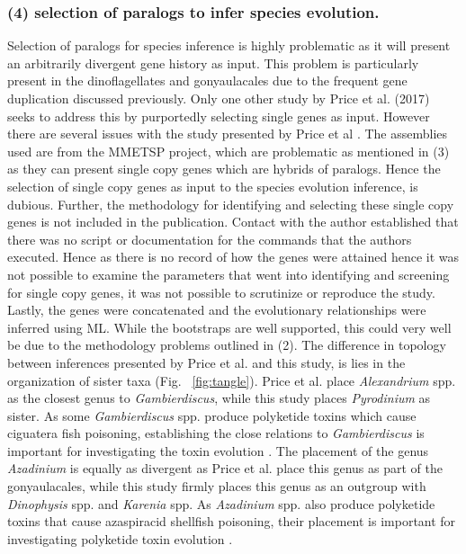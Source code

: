 \documentclass[12pt]{article}
\begin{document}
\subsubsection*{(4) selection of paralogs to infer species evolution.}
Selection of paralogs for species inference is highly problematic as it will present an arbitrarily divergent gene history as input. 
This problem is particularly present in the dinoflagellates and gonyaulacales due to the frequent gene duplication discussed previously. %
Only one other study by Price et al. (2017) seeks to address this by purportedly selecting single genes as input. 
However there are several issues with the study presented by Price et al \cite{price2017robust}. 
The assemblies used are from the MMETSP project, which are problematic as mentioned in (3) as they can present single copy genes which are hybrids of paralogs. 
Hence the selection of single copy genes as input to the species evolution inference, is dubious. 
Further, the methodology for identifying and selecting these single copy genes is not included in the publication. 
Contact with the author established that there was no script or documentation for the commands that the authors executed. 
Hence as there is no record of how the genes were attained hence it was not possible to examine the parameters that went into identifying and screening for single copy genes, it was not possible to scrutinize or reproduce the study.
Lastly, the genes were concatenated and the evolutionary relationships were inferred using ML. While the bootstraps are well supported, this could very well be due to the methodology problems outlined in (2).
The difference in topology between inferences presented by Price et al. and this study, is lies in the organization of sister taxa (Fig. ~\ref{fig:tangle}). 
Price et al. place \emph{Alexandrium} spp. as the closest genus to \emph{Gambierdiscus}, while this study places \emph{Pyrodinium} as sister. 
As some \emph{Gambierdiscus} spp. produce polyketide toxins which cause ciguatera fish poisoning, establishing the close relations to \emph{Gambierdiscus} is important for investigating the toxin evolution \cite{pawlowiez2014transcriptome}.
The placement of the genus \emph{Azadinium} is equally as divergent as Price et al. place this genus as part of the gonyaulacales, while this study firmly places this genus as an outgroup with \emph{Dinophysis} spp. and \emph{Karenia} spp.
As \emph{Azadinium} spp. also produce polyketide toxins that cause azaspiracid shellfish poisoning, their placement is important for investigating polyketide toxin evolution \cite{meyer2015transcriptomic}.
\end{document}

